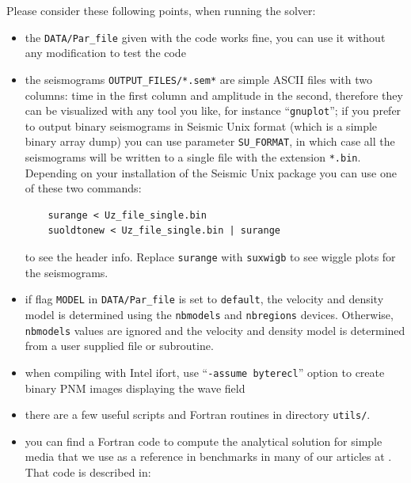 Please consider these following points, when running the solver:
%
\begin{itemize}
\item the \texttt{DATA/Par\_file} given with the code works fine, you can use it without any modification to test the code

\item the seismograms \texttt{OUTPUT\_FILES/*.sem*} are simple ASCII files with two columns: time in the first column and amplitude in the second, therefore they can be visualized with any tool you like, for instance ``\texttt{gnuplot}''; if you prefer to output binary seismograms in Seismic Unix format (which is a simple binary array dump) you can use parameter \texttt{SU\_FORMAT}, in which case all the seismograms will be written to a single file with the extension \texttt{*.bin}.
Depending on your installation of the Seismic Unix package you can use one of these two commands:
%
\begin{verbatim}
    surange < Uz_file_single.bin
    suoldtonew < Uz_file_single.bin | surange
\end{verbatim}
%
to see the header info.
Replace \texttt{surange} with \texttt{suxwigb} to see wiggle plots for the seismograms.

\item if flag \texttt{MODEL} in \texttt{DATA/Par\_file} is set to \texttt{default}, the velocity and density model is determined using the \texttt{nbmodels} and \texttt{nbregions} devices.  Otherwise, \texttt{nbmodels} values are ignored and the velocity and density model is determined from a user supplied file or subroutine.

\item when compiling with Intel ifort, use ``\texttt{-assume byterecl}'' option to create binary PNM images displaying the wave field

\item there are a few useful scripts and Fortran routines in directory \texttt{utils/}.

\item you can find a Fortran code to compute the analytical solution for simple media that we use as a reference in benchmarks in many of our articles at
. That code is described in: \cite{BeIfNiSk94}

\end{itemize}


